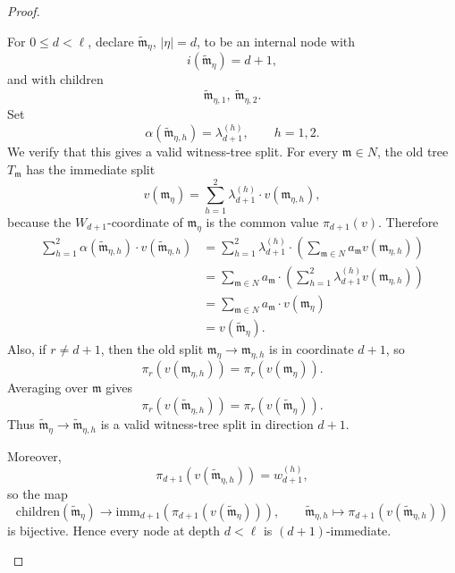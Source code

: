 \documentclass[10pt]{amsart}
\theoremstyle{plain}
\theoremstyle{definition}
\let\leq\leqslant
\providecommand{\imm}[0]{\ensuremath{\mathrm{imm}}\xspace}
\begin{document}
\begin{proof}
\begin{enumerate}[1.]
\begin{enumerate}
For \(0\leq d<\ell\), declare \(\widetilde{\mathfrak{m}}_\eta\), \(|\eta|=d\), to be an internal node with
\[
        i(\widetilde{\mathfrak{m}}_\eta)=d+1,
\]
and with children
\[
        \widetilde{\mathfrak{m}}_{\eta,1},\ \widetilde{\mathfrak{m}}_{\eta,2}.
\]
Set
\[
        \alpha(\widetilde{\mathfrak{m}}_{\eta,h})=\lambda_{d+1}^{(h)},\qquad h=1,2.
\]
We verify that this gives a valid witness-tree split. For every \(\mathfrak{m}\in N\), the old tree
\(T_{\mathfrak{m}}\) has the immediate split
\[
        v(\mathfrak{m}_\eta)
        =
        \sum_{h=1}^2
        \lambda_{d+1}^{(h)} \cdot v(\mathfrak{m}_{\eta,h}),
\]
because the \(W_{d+1}\)-coordinate of \(\mathfrak{m}_\eta\) is the common value
\(\pi_{d+1}(v)\).  Therefore
\[
\begin{aligned}
        \sum_{h=1}^2 \alpha(\widetilde{\mathfrak{m}}_{\eta,h})\cdot v(\widetilde{\mathfrak{m}}_{\eta,h})
        &=
        \sum_{h=1}^2
        \lambda_{d+1}^{(h)} \cdot
        \left(
        \sum_{\mathfrak{m}\in N}a_{\mathfrak{m}} v(\mathfrak{m}_{\eta,h}) 
        \right)\\
        &=
        \sum_{\mathfrak{m}\in N}a_{\mathfrak{m}} \cdot 
        \left(
        \sum_{h=1}^2
        \lambda_{d+1}^{(h)}v(\mathfrak{m}_{\eta,h}) 
        \right)\\
        &=
        \sum_{\mathfrak{m}\in N}a_{\mathfrak{m}} \cdot v(\mathfrak{m}_\eta) \\
        &=
        v(\widetilde{\mathfrak{m}}_\eta).
\end{aligned}
\]
Also, if \(r\neq d+1\), then the old split
\(\mathfrak{m}_\eta\to \mathfrak{m}_{\eta,h}\) is in coordinate \(d+1\), so
\[
        \pi_r(v(\mathfrak{m}_{\eta,h}))=\pi_r(v(\mathfrak{m}_\eta)).
\]
Averaging over \(\mathfrak{m}\) gives
\[
        \pi_r(v(\widetilde{\mathfrak{m}}_{\eta,h}))=\pi_r(v(\widetilde{\mathfrak{m}}_\eta)).
\]
Thus \(\widetilde{\mathfrak{m}}_\eta\to \widetilde{\mathfrak{m}}_{\eta,h}\) is a valid witness-tree split in direction \(d+1\).

Moreover,
\[
        \pi_{d+1}(v(\widetilde{\mathfrak{m}}_{\eta,h}))=w_{d+1}^{(h)},
\]
so the map
\[
        \mathrm{children}(\widetilde{\mathfrak{m}}_\eta)\longrightarrow
        \imm_{d+1}(\pi_{d+1}(v(\widetilde{\mathfrak{m}}_\eta))),
        \qquad
        \widetilde{\mathfrak{m}}_{\eta,h}
        \longmapsto \pi_{d+1}(v(\widetilde{\mathfrak{m}}_{\eta,h}))
\]
is bijective. Hence every node at depth \(d<\ell\) is \((d+1)\)-immediate.


\end{enumerate}
\end{enumerate}
\end{proof}
\end{document}
